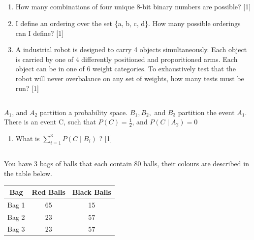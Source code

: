 \documentclass[twocolumn]{article}
\newcounter{pmarks}
\newcounter{marks}
\newcommand\mrk[1]{{\hfill\color{blue}\small[{#1}]}\addtocounter{pmarks}{#1}\addtocounter{marks}{#1}}
\begin{document}
\subsection{}

    \begin{enumerate}
        \item How many combinations of four unique 8-bit binary numbers are possible? \mrk{1}
        \item I define an ordering over the set \{a, b, c, d\}. How many possible orderings can I define? \mrk{1}
        \item A industrial robot is designed to carry 4 objects simultaneously. Each object is carried by one of 4 differently positioned and proporitioned arms. Each object can be in one of 6 weight categories. To exhaustively test that the robot will never overbalance on any set of weights, how many tests must be run? \mrk{1}
    \end{enumerate}

\subsection{}

    $A_1$, and $A_2$ partition a probability space. $B_1, B_2,$ and $B_3$ partition the event $A_1$. There is an event C, such that $P(C) = \frac{1}{2}$, and $P(C \mid A_2) = 0$
    
    \begin{enumerate}
        \item What is $\sum_{i=1}^3 P(C \mid B_i) $ ? \mrk{1}
    \end{enumerate}
    
\subsection{}

    You have 3 bags of balls that each contain 80 balls, their colours are described in the table below.

    \begin{table}[h!]
        \centering
        \begin{tabular}{c | c | c }
            \toprule
            Bag & Red Balls & Black Balls \\
            \midrule
            Bag 1 & 65 & 15  \\
            Bag 2 & 23 & 57  \\
            Bag 3 & 23 & 57 \\
            \bottomrule
        \end{tabular}
    \end{table}
\end{document}
